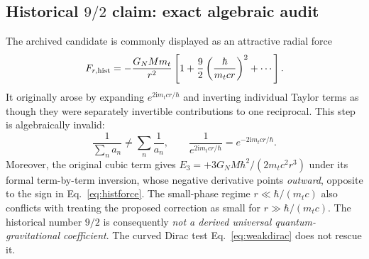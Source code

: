\documentclass[11pt,a4paper]{article}
\theoremstyle{remark}
\newcommand{\ii}{\mathrm i}
\newcommand{\eref}[1]{Eq.~\eqref{#1}}
\begin{document}
\subsection{Historical \texorpdfstring{$9/2$}{9/2} claim: exact algebraic audit}
The archived candidate is commonly displayed as an attractive radial force
\begin{equation}\label{eq:histforce}
 F_{r,\rm hist}=-\frac{G_NMm_t}{r^2}\left[1+\frac92\left(\frac{\hbar}{m_tcr}\right)^2+\cdots\right].
\end{equation}
It originally arose by expanding $e^{2\ii m_tcr/\hbar}$ and inverting individual Taylor terms as though they were separately invertible contributions to one reciprocal. This step is algebraically invalid:
\begin{equation}
\frac{1}{\sum_na_n}\ne\sum_n\frac1{a_n},\qquad
\frac1{e^{2\ii m_tcr/\hbar}}=e^{-2\ii m_tcr/\hbar}.
\end{equation}
Moreover, the original cubic term gives $E_3=+3G_NM\hbar^2/(2m_tc^2r^3)$ under its formal term-by-term inversion, whose negative derivative points \emph{outward}, opposite to the sign in \eref{eq:histforce}. The small-phase regime $r\ll\hbar/(m_tc)$ also conflicts with treating the proposed correction as small for $r\gg\hbar/(m_tc)$. The historical number $9/2$ is consequently \emph{not a derived universal quantum-gravitational coefficient}. The curved Dirac test \eref{eq:weakdirac} does not rescue it.
\end{document}
